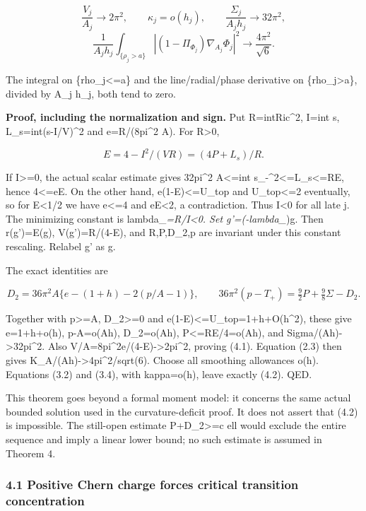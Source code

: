 \documentclass[
  10pt,
]{article}
\begin{document}
\[
 \frac{V_j}{A_j}\to2\pi^2,\qquad
 \kappa_j=o(h_j),\qquad
 \frac{\Sigma_j}{A_jh_j}\to32\pi^2,
                                                        \tag{4.1}
\] \[
 \boxed{\frac1{A_jh_j}
   \int_{\{\rho_j>a\}}|(1-\Pi_{\Phi_j})\nabla_{A_j}\Phi_j|^2
       \longrightarrow\frac{4\pi^2}{\sqrt6}.}           \tag{4.2}
\]

The integral on \{rho\_j\textless=a\} and the line/radial/phase
derivative on \{rho\_j\textgreater a\}, divided by A\_j h\_j, both tend
to zero.

\textbf{Proof, including the normalization and sign.} Put
R=int\textbar Ric\textbar\^{}2, I=int s, L\_s=int(s-I/V)\^{}2 and
e=R/(8pi\^{}2 A). For R\textgreater0,

\[
 E=4-I^2/(VR)=(4P+L_s)/R.
\]

If I\textgreater=0, the actual scalar estimate gives 32pi\^{}2
A\textless=int s\_-\^{}2\textless=L\_s\textless=RE, hence 4\textless=eE.
On the other hand, e(1-E)\textless=U\_top and U\_top\textless=2
eventually, so for E\textless1/2 we have e\textless=4 and eE\textless2,
a contradiction. Thus I\textless0 for all late j. The minimizing
constant is lambda\_\emph{=R/I\textless0. Set g'=(-lambda\_})g. Then
r(g')=E(g), V(g')=R/(4-E), and R,P,D\_2,p are invariant under this
constant rescaling. Relabel g' as g.

The exact identities are

\[
 D_2=36\pi^2A\{e-(1+h)-2(p/A-1)\},\qquad
 36\pi^2(p-T_+)=\tfrac92P+\tfrac98\Sigma-D_2.
\]

Together with p\textgreater=A, D\_2\textgreater=0 and
e(1-E)\textless=U\_top=1+h+O(h\^{}2), these give e=1+h+o(h), p-A=o(Ah),
D\_2=o(Ah), P\textless=RE/4=o(Ah), and Sigma/(Ah)-\textgreater32pi\^{}2.
Also V/A=8pi\^{}2e/(4-E)-\textgreater2pi\^{}2, proving (4.1). Equation
(2.3) then gives K\_A/(Ah)-\textgreater4pi\^{}2/sqrt(6). Choose all
smoothing allowances o(h). Equations (3.2) and (3.4), with kappa=o(h),
leave exactly (4.2). QED.

This theorem goes beyond a formal moment model: it concerns the same
actual bounded solution used in the curvature-deficit proof. It does not
assert that (4.2) is impossible. The still-open estimate
P+D\_2\textgreater=c ell would exclude the entire sequence and imply a
linear lower bound; no such estimate is assumed in Theorem 4.

\hypertarget{positive-chern-charge-forces-critical-transition-concentration}{%
\subsubsection{4.1 Positive Chern charge forces critical transition
concentration}\label{positive-chern-charge-forces-critical-transition-concentration}}
\end{document}
